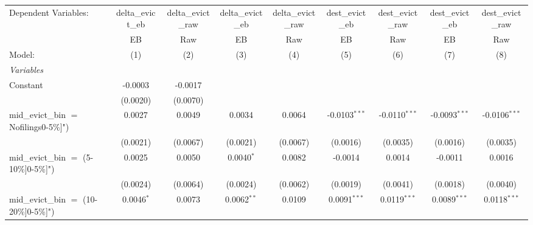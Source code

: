 \begingroup
\centering
\begin{tabular}{lcccccccc}
   \tabularnewline \midrule \midrule
   Dependent Variables:                      & delta\_evict\_eb   & delta\_evict\_raw     & delta\_evict\_eb   & delta\_evict\_raw   & dest\_evict\_eb   & dest\_evict\_raw   & dest\_evict\_eb   & dest\_evict\_raw\\    
                                             & EB                 & Raw                   & EB                 & Raw                 & EB                & Raw                & EB                & Raw \\   
   Model:                                    & (1)                & (2)                   & (3)                & (4)                 & (5)               & (6)                & (7)               & (8)\\  
   \midrule
   \emph{Variables}\\
   Constant                                  & -0.0003            & -0.0017               &                    &                     &                   &                    &                   &   \\   
                                             & (0.0020)           & (0.0070)              &                    &                     &                   &                    &                   &   \\   
   mid\_evict\_bin $=$ Nofilings0-5\%]")     & 0.0027             & 0.0049                & 0.0034             & 0.0064              & -0.0103$^{***}$   & -0.0110$^{***}$    & -0.0093$^{***}$   & -0.0106$^{***}$\\   
                                             & (0.0021)           & (0.0067)              & (0.0021)           & (0.0067)            & (0.0016)          & (0.0035)           & (0.0016)          & (0.0035)\\   
   mid\_evict\_bin $=$ (5-10\%]0-5\%]")      & 0.0025             & 0.0050                & 0.0040$^{*}$       & 0.0082              & -0.0014           & 0.0014             & -0.0011           & 0.0016\\   
                                             & (0.0024)           & (0.0064)              & (0.0024)           & (0.0062)            & (0.0019)          & (0.0041)           & (0.0018)          & (0.0040)\\   
   mid\_evict\_bin $=$ (10-20\%]0-5\%]")     & 0.0046$^{*}$       & 0.0073                & 0.0062$^{**}$      & 0.0109              & 0.0091$^{***}$    & 0.0119$^{***}$     & 0.0089$^{***}$    & 0.0118$^{***}$\\   

\end{tabular}

